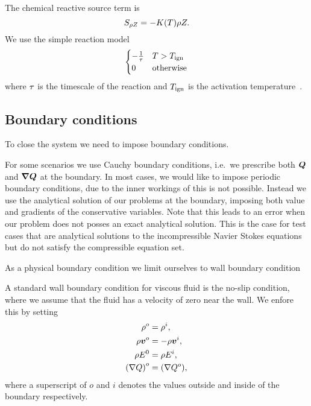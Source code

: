 The chemical reactive source term is
\begin{equation}\label{eq:source-reaction}
  \source[\QZ] = - K(T) \QZ.
\end{equation}
We use the simple reaction model
\begin{equation}\label{eq:reaction-model}
\begin{cases}
  - \frac{1}{\tau} & T > T_{\text{ign}}\\
  0 & \text{otherwise}
\end{cases}  
\end{equation}
where $\tau$ is the timescale of the reaction and $T_{\text{ign}}$ is the activation temperature~\cite{hidalgo2011ader,helzel2000modified}.
\subsection{Boundary conditions}
To close the system we need to impose boundary conditions.

For some scenarios we use Cauchy boundary conditions, i.e.\ we prescribe both $\bm{Q}$ and $\gradQ$ at the boundary.
In most cases, we would like to impose periodic boundary conditions, due to the inner workings of \exahype{} this is not possible.
Instead we use the analytical solution of our problems at the boundary, imposing both value and gradients of the conservative variables.
Note that this leads to an error when our problem does not posses an exact analytical solution.
This is the case for test cases that are analytical solutions to the incompressible Navier Stokes equations but do not satisfy the compressible equation set.

As a physical boundary condition we limit ourselves to wall boundary condition

A standard wall boundary condition for viscous fluid is the no-slip condition, where we assume that the fluid has a velocity of zero near the wall.
We enfore this by setting
\begin{align}
  \label{eq:no-slip}
  \begin{split}
  \rho^o &= \rho^i, \\
  \rho \bm{v}^o &= -\rho \bm{v}^i, \\
  \rho E^0 &= \rho E^i,\\
  {(\nabla Q)}^o &= {(\nabla Q^o)},
  \end{split}
\end{align}
where a superscript of $o$ and $i$ denotes the values outside and inside of the boundary respectively.

